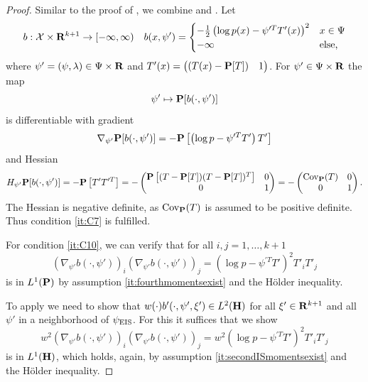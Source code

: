 \begin{proof}
    Similar to the proof of , we combine  and . Let 
    \begin{align*}
        b : \mathcal X \times \R^{k + 1} \to [-\infty, \infty) && b(x, \psi') =  \begin{cases}
            -\frac{1}{2} \left( \log p(x) - \psi^{\prime T}T'(x) \right)^{2} & x \in \Psi \\
            -\infty & \text{else,}
        \end{cases}
    \end{align*}
    where $\psi' = (\psi, \lambda) \in \Psi \times\R$ and $T'(x) = \begin{pmatrix} (T(x) - \P[T]) & 1 \end{pmatrix}$. For $\psi' \in \Psi \times \R$ the map $$\psi' \mapsto \P [b(\cdot, \psi')]$$ is differentiable with gradient 
    $$
        \nabla_{\psi'} \P [b(\cdot, \psi')] = - \P \left[\left( \log p - \psi^{\prime T}T' \right) T'\right] $$
    and Hessian 
    $$
        H_{\psi'} \P[b(\cdot, \psi')] = -\P\left[T'T^{\prime T}\right] = - \begin{pmatrix}
            \P \left[ (T - \P[T])(T - \P[T])^{T} \right] & 0 \\
            0 & 1
        \end{pmatrix} = - \begin{pmatrix}
            \cov_{\P}(T) & 0 \\
            0 & 1
        \end{pmatrix}.
    $$
    The Hessian is negative definite, as $\cov_{\P}(T)$ is assumed to be positive definite. Thus condition \ref{it:C7} is fulfilled.

    For condition \ref{it:C10}, we can verify that for all $i,j = 1,\dots, k+ 1$ 
    $$
        (\nabla_{\psi'} b(\cdot, \psi'))_{i}(\nabla_{\psi'} b(\cdot, \psi'))_{j} = \left( \log p - \psi^{\prime T}T' \right)^{2} T'_{i}T'_{j}
    $$
    is in $L^{1}(\P)$ by assumption \ref{it:fourthmomentsexist} and the Hölder inequality. 

    To apply  we need to show that $w(\cdot)b'(\cdot, \psi',\xi') \in L^{2}(\H)$ for all $\xi'\in\R^{k + 1}$ and all $\psi'$ in a neighborhood of $\peis$. For this it suffices that we show 
    $$
        w^{2}(\nabla_{\psi'} b(\cdot, \psi'))_{i}(\nabla_{\psi'} b(\cdot, \psi'))_{j} = w^{2}\left( \log p - \psi^{\prime T}T' \right)^{2} T'_{i}T'_{j}
    $$
    is in $L^{1}(\H)$, which holds, again, by assumption \ref{it:secondISmomentsexist} and the Hölder inequality.


\end{proof}
